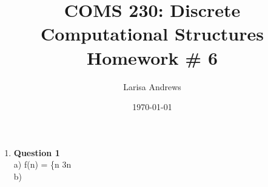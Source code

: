 \documentclass[12pt]{article}
\begin{document}

\title{
\textbf{COMS 230: Discrete Computational Structures}\\
Homework \# 6 \\}
\author{Larisa Andrews}
\date{\today}
\maketitle

\begin{enumerate}

\item {\bf Question 1} \\
a) f(n) = \{n
			3n\\
b)  

	
	
	
	


\end{enumerate}
\end{document}

